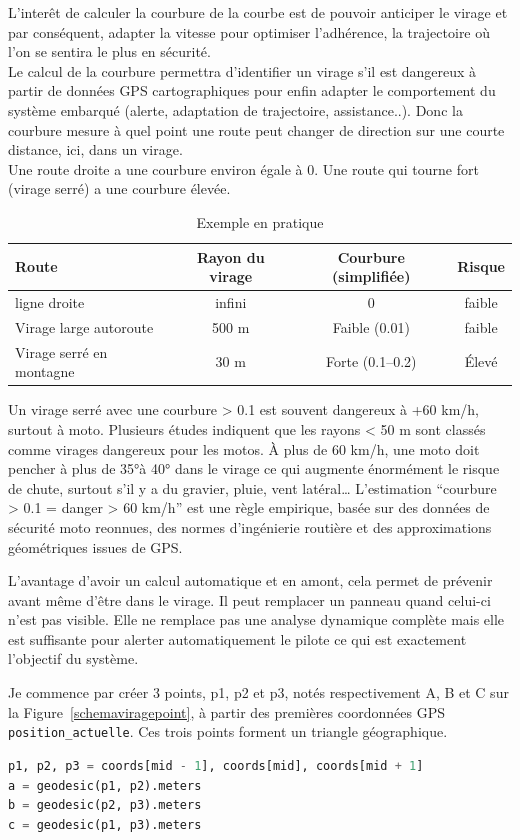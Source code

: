 \vspace{0.5cm}
L'interêt de calculer la courbure de la courbe est de pouvoir anticiper le virage et par conséquent, adapter la vitesse pour optimiser l'adhérence, la trajectoire où l'on se sentira le plus en sécurité. \\
Le calcul de la courbure permettra d'identifier un virage s'il est dangereux à partir de données GPS cartographiques pour enfin adapter le comportement du système embarqué (alerte, adaptation de trajectoire, assistance..).
Donc la courbure mesure à quel point une route peut changer de direction sur une courte distance, ici, dans un virage.\\
Une route droite a une courbure environ égale à 0. Une route qui tourne fort (virage serré) a une courbure élevée.

\begin{table}[ht]
\centering
\begin{tabular}{|l|c|c|c|}
\hline
Route & Rayon du virage & Courbure (simplifiée) & Risque \\
\hline
ligne droite & infini & 0 & faible \\
Virage large autoroute & 500 m & Faible (0.01) & faible \\
Virage serré en montagne & 30 m & Forte (0.1–0.2) & Élevé \\
\hline
\end{tabular}
\caption{Exemple en pratique}
\end{table}

Un virage serré avec une courbure > 0.1 est souvent dangereux à +60 km/h, surtout à moto.
Plusieurs études indiquent que les rayons < 50 m sont classés comme virages dangereux pour les motos. À plus de 60 km/h, une moto doit pencher à plus de 35°à 40° dans le virage ce qui augmente énormément le risque de chute, surtout s’il y a du gravier, pluie, vent latéral…
L’estimation “courbure > 0.1 = danger > 60 km/h” est une règle empirique, basée sur des données de sécurité moto reonnues, des normes d'ingénierie routière et des approximations géométriques issues de GPS.


L'avantage d'avoir un calcul automatique et en amont, cela permet de prévenir avant même d'être dans le virage. Il peut remplacer un panneau quand celui-ci n'est pas visible. Elle ne remplace pas une analyse dynamique complète mais elle est suffisante pour alerter automatiquement le pilote ce qui est exactement l’objectif du système.

Je commence par créer 3 points, p1, p2 et p3, notés respectivement A, B et C sur la Figure~\ref{schemaviragepoint}, à partir des premières coordonnées GPS \texttt{position\_actuelle}. Ces trois points forment un triangle géographique.
\begin{lstlisting}[language=Python, caption={Calcul de points}]
p1, p2, p3 = coords[mid - 1], coords[mid], coords[mid + 1]
a = geodesic(p1, p2).meters
b = geodesic(p2, p3).meters
c = geodesic(p1, p3).meters
\end{lstlisting}

